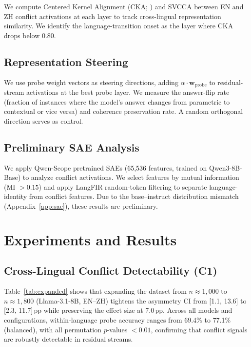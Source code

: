 \documentclass{article}
\begin{document}
We compute Centered Kernel Alignment (CKA; \citealp{kornblith2019similarity}) and SVCCA \citep{raghu2017svcca} between EN and ZH conflict activations at each layer to track cross-lingual representation similarity. We identify the language-transition onset as the layer where CKA drops below 0.80.

\subsection{Representation Steering}

We use probe weight vectors as steering directions, adding $\alpha \cdot \mathbf{w}_{\text{probe}}$ to residual-stream activations at the best probe layer. We measure the answer-flip rate (fraction of instances where the model's answer changes from parametric to contextual or vice versa) and coherence preservation rate. A random orthogonal direction serves as control.

\subsection{Preliminary SAE Analysis}

We apply Qwen-Scope pretrained SAEs (65,536 features, trained on Qwen3-8B-Base) to analyze conflict activations. We select features by mutual information (MI $> 0.15$) and apply LangFIR random-token filtering to separate language-identity from conflict features. Due to the base--instruct distribution mismatch (Appendix~\ref{app:sae}), these results are preliminary.

\section{Experiments and Results}

\subsection{Cross-Lingual Conflict Detectability (C1)}
\label{sec:detectability}

Table~\ref{tab:expanded} shows that expanding the dataset from $n \approx 1{,}000$ to $n \approx 1{,}800$ (Llama-3.1-8B, EN--ZH) tightens the asymmetry CI from [1.1, 13.6] to [2.3, 11.7]\,pp while preserving the effect size at 7.0\,pp. Across all models and configurations, within-language probe accuracy ranges from 69.4\% to 77.1\% (balanced), with all permutation $p$-values $ < 0.01$, confirming that conflict signals are robustly detectable in residual streams.
\end{document}
